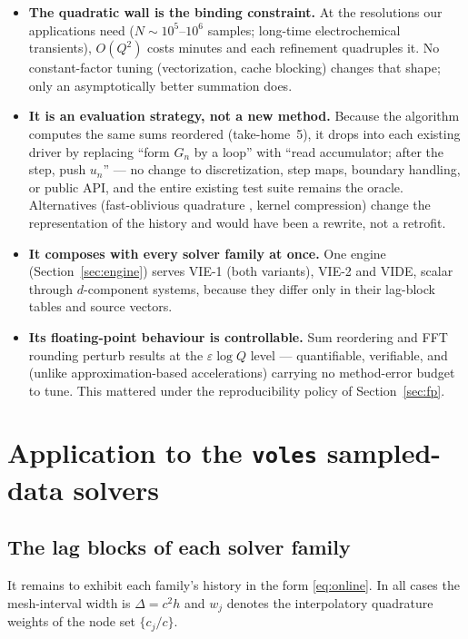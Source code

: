 \documentclass[11pt]{article}
\newcommand{\voles}{\texttt{voles}}
\begin{document}
\begin{itemize}
\item \textbf{The quadratic wall is the binding constraint.} At the
  resolutions our applications need ($N\sim10^5$--$10^6$ samples;
  long-time electrochemical transients), $O(Q^2)$ costs minutes and
  each refinement quadruples it. No constant-factor tuning
  (vectorization, cache blocking) changes that shape; only an
  asymptotically better summation does.
\item \textbf{It is an evaluation strategy, not a new method.} Because
  the algorithm computes the same sums reordered
  (take-home~5), it drops into each existing driver by replacing
  ``form $G_n$ by a loop'' with ``read accumulator; after the step,
  push $u_n$'' --- no change to discretization, step maps, boundary
  handling, or public API, and the entire existing test suite remains
  the oracle. Alternatives (fast-oblivious quadrature
  \cite{schadle2006}, kernel compression) change the representation of
  the history and would have been a rewrite, not a retrofit.
\item \textbf{It composes with every solver family at once.} One
  engine (Section~\ref{sec:engine}) serves VIE-1 (both variants),
  VIE-2 and VIDE, scalar through $d$-component systems, because they
  differ only in their lag-block tables and source vectors.
\item \textbf{Its floating-point behaviour is controllable.} Sum
  reordering and FFT rounding perturb results at the
  $\varepsilon\log Q$ level --- quantifiable, verifiable, and (unlike
  approximation-based accelerations) carrying no method-error budget
  to tune. This mattered under the reproducibility policy of
  Section~\ref{sec:fp}.
\end{itemize}

\section{Application to the \voles{} sampled-data solvers}
\label{sec:apply}

\subsection{The lag blocks of each solver family}
\label{sec:blocks}

It remains to exhibit each family's history in the form
\eqref{eq:online}. In all cases the mesh-interval width is
$\Delta=c^2h$ and $w_j$ denotes the interpolatory quadrature weights of
the node set $\{c_j/c\}$.
\end{document}
